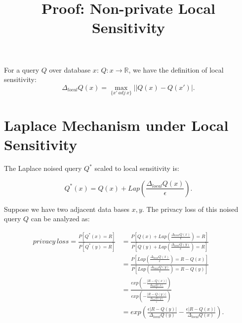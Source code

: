\documentclass{article}
\title{\textbf{Proof: Non-private Local Sensitivity}\\
}
\begin{document}
\maketitle %




For a query $Q$ over database $x$: $Q: x \rightarrow \mathbb{R}$, we have the definition of local sensitivity:
\begin{equation*}
\Delta_{local} Q(x) = \max_{\{x'\ adj\ x\}}| |Q(x)- Q(x')|.
\end{equation*}

\section{Laplace Mechanism under Local Sensitivity}

The Laplace noised query $Q^{*}$ scaled to local sensitivity is:

\begin{equation*}
Q^{*}(x) = Q(x) + Lap(\frac{\Delta_{local} Q(x)}{\epsilon}).
\end{equation*}

Suppose we have two adjacent data bases $x,y$. The privacy loss of this noised query $Q$ can be analyzed as:

\begin{equation*}
\begin{split}
privacy\ loss = \frac{P[Q^{*}(x) = R]}{P[Q^{*}(y) = R]}
& = \frac{P[Q(x) + Lap(\frac{\Delta_{local} Q(x)}{\epsilon}) = R]}{P[Q(y) + Lap(\frac{\Delta_{local} Q(y)}{\epsilon}) = R]}\\
& = \frac{P[Lap(\frac{\Delta_{local} Q(x)}{\epsilon}) = R - Q(x)]}{P[Lap(\frac{\Delta_{local} Q(y)}{\epsilon}) = R - Q(y)]}\\
& = \frac{exp(-\frac{|R - Q(x)|}{\frac{\Delta_{local} Q(x)}{\epsilon}})}{exp(-\frac{|R - Q(y)|}{\frac{\Delta_{local} Q(y)}{\epsilon}})}\\
& = exp(\frac{\epsilon |R - Q(y)|}{\Delta_{local} Q(y)} - \frac{\epsilon |R - Q(x)|}{\Delta_{local} Q(x)}).
\end{split}
\end{equation*}
\end{document}
